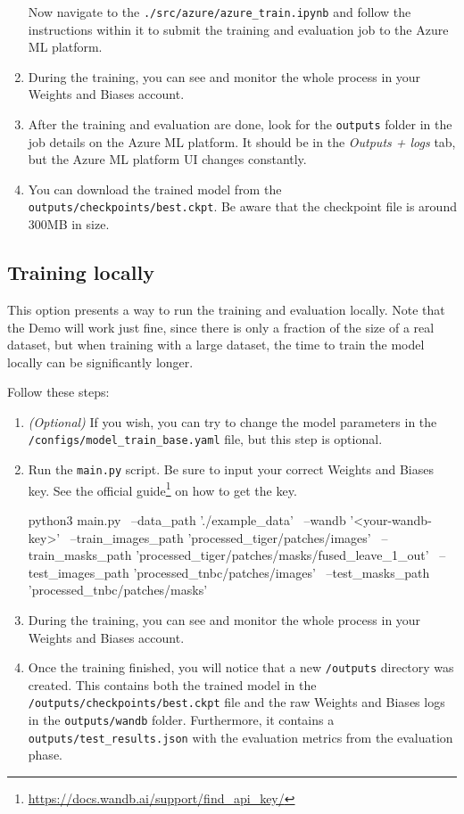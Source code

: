 \begin{enumerate}
  Now navigate to the
  \texttt{./src/azure/azure\_train.ipynb} and follow
  the instructions within it to submit the training and evaluation job
  to the Azure ML platform.
\item
  During the training, you can see and monitor the whole process in your
  Weights and Biases account.
\item
  After the training and evaluation are done, look for the
  \texttt{outputs} folder in the job details on the Azure ML platform.
  It should be in the \emph{Outputs + logs} tab, but the Azure ML
  platform UI changes constantly.
\item
  You can download the trained model from the
  \texttt{outputs/checkpoints/best.ckpt}. Be aware that the checkpoint
  file is around 300MB in size.
\end{enumerate}

\subsection{Training locally}\label{b-training-locally}

This option presents a way to run the training and evaluation
locally. Note that the Demo will work just fine, since there is only a
fraction of the size of a real dataset, but when training with a large
dataset, the time to train the model locally can be significantly
longer.

Follow these steps:

\begin{enumerate}
    \item \emph{(Optional)} If you wish, you can try to change the model parameters in the \texttt{/configs/model\_train\_base.yaml} file, but this step is optional.
    \item Run the \texttt{main.py} script. Be sure to input your correct Weights and Biases key. See the official guide\footnote{\url{https://docs.wandb.ai/support/find_api_key/}} on how to get the key.
    \begin{bashlisting}
python3 main.py \
  --data_path './example_data' \
  --wandb '<your-wandb-key>' \
  --train_images_path 'processed_tiger/patches/images' \
  --train_masks_path 'processed_tiger/patches/masks/fused_leave_1_out' \
  --test_images_path 'processed_tnbc/patches/images' \
  --test_masks_path 'processed_tnbc/patches/masks'
\end{bashlisting}
    
    \item During the training, you can see and monitor the whole process in your Weights and Biases account.
    \item Once the training finished, you will notice that a new \texttt{/outputs} directory was created. This contains both the trained model in the \texttt{/outputs/checkpoints/best.ckpt} file and the raw Weights and Biases logs in the \texttt{outputs/wandb} folder. Furthermore, it contains a \texttt{outputs/test\_results.json} with the evaluation metrics from the evaluation phase.
\end{enumerate}

